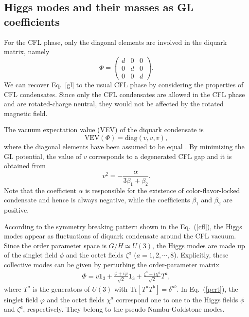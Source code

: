 \documentclass[12pt]{article}
\begin{document}
\subsection{Higgs modes and their masses as GL coefficients}
\label{sssec:1}

For the CFL phase, only the diagonal elements are involved in the diquark matrix, namely
\begin{equation}
  \label{eq:phi}
  \Phi =
  \begin{pmatrix}
    d & 0 & 0 \\
    0 & d & 0 \\
    0 & 0 & d
    \end{pmatrix}.
\end{equation}
We can recover Eq.~\eqref{gl} to the usual CFL phase by considering the properties of CFL condensates. 
Since only the CFL condensates are allowed in the CFL phase and are rotated-charge
neutral, they would not be affected by the rotated magnetic field.



The vacuum expectation value (VEV) of the diquark condensate is
\begin{equation}
  \text{VEV}(\Phi)=\text{diag}(v,v,v) ,\label{cflground}
\end{equation}
where the diagonal elements have been assumed to be equal \cite{iida2002superfluid}. 
By minimizing the GL potential, 
the value of
$v$ corresponds to a degenerated CFL gap and it is obtained from
\begin{equation}
  \label{eq:dvaccum}
v^2 = -\frac{\alpha}{3\beta_1+\beta_2}.
\end{equation}
Note that the coefficient $\alpha$ is responsible for the existence of color-flavor-locked condensate
and hence is always negative, while the coefficients $\beta_1$ and $\beta_2$ are positive.


According to the symmetry breaking pattern shown in the Eq.~(\ref{cfl}),
the Higgs modes appear as fluctuations of diquark condensate around the
CFL vacuum. Since the order parameter space is $G/H \simeq U(3)$, the Higgs modes are made up of the
singlet field $\phi$ and the octet fields $\zeta^a$ ($a = 1, 2, \cdots, 8$). Explicitly, these
collective modes can be given by perturbing the order-parameter matrix
\begin{eqnarray}
\Phi=v\textbf{1}_3+\frac{\phi+i\varphi}{\sqrt{2}}\textbf{1}_3+\frac{\zeta^a+i\chi^a}{\sqrt{2}}T^a,
\label{pert}
\end{eqnarray}
where $T^a$ is the generators of $U(3)$ with $\text{Tr}[T^a T^b]=\delta^{ab}$.
In Eq.~(\ref{pert}), the singlet field $\varphi$ and the octet fields $\chi^a$ correspond one to
one to the Higgs fields $\phi$ and $\zeta^a$, respectively. They belong to the pseudo Nambu-Goldstone
modes.
\end{document}
